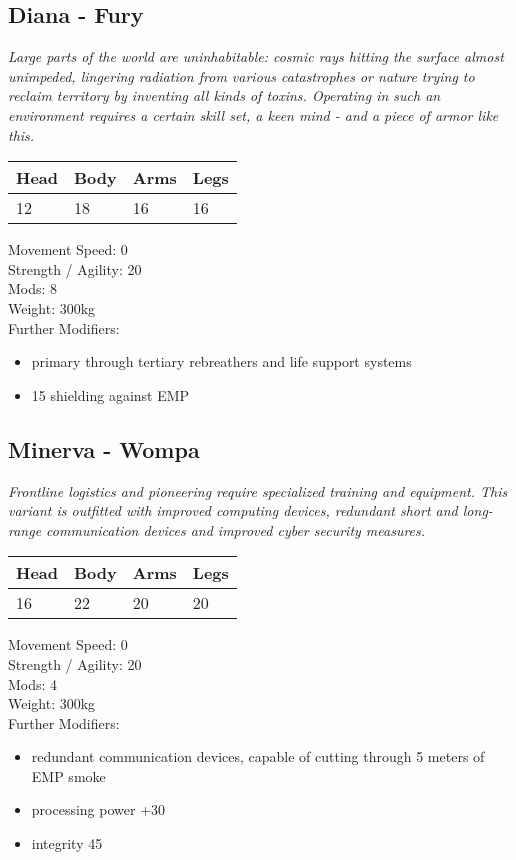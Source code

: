 \documentclass[12pt,a4paper,openany]{book}
\begin{document}
	\subsection{Diana - Fury}
	\textit{Large parts of the world are uninhabitable: cosmic rays hitting the surface almost unimpeded, lingering radiation from various catastrophes or nature trying to reclaim territory by inventing all kinds of toxins. Operating in such an environment requires a certain skill set, a keen mind - and a piece of armor like this.}\par
	\begin{tabular}{|l|l|l|l|}
		\hline
		Head & Body & Arms & Legs\\
		\hline
		12 & 18 & 16 & 16\\
		\hline
	\end{tabular}
	\par
	Movement Speed: 0\\
	Strength / Agility: 20\\
	Mods: 8\\
	Weight: 300kg\\
	Further Modifiers:
	\vspace{-8mm}
	\begin{itemize}
		\setlength\itemsep{-8mm}
		\item primary through tertiary rebreathers and life support systems
		\item 15 shielding against EMP
	\end{itemize}
	\par
	\subsection{Minerva - Wompa}
	\textit{Frontline logistics and pioneering require specialized training and equipment. This variant is outfitted with improved computing devices, redundant short and long-range communication devices and improved cyber security measures.}\par
	\begin{tabular}{|l|l|l|l|}
		\hline
		Head & Body & Arms & Legs\\
		\hline
		16 & 22 & 20 & 20\\
		\hline
	\end{tabular}
	\par
	Movement Speed: 0\\
	Strength / Agility: 20\\
	Mods: 4\\
	Weight: 300kg\\
	Further Modifiers:
	\vspace{-8mm}
	\begin{itemize}
		\setlength\itemsep{-8mm}
		\item redundant communication devices, capable of cutting through 5 meters of EMP smoke
		\item processing power +30
		\item integrity 45
	\end{itemize}
	\par
\end{document}

